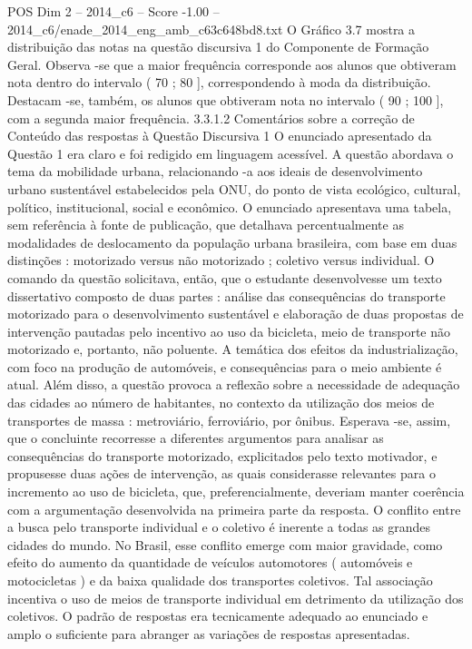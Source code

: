 \begin{textsample}{POS Dim 2 – 2014\_c6 – Score -1.00 – 2014\_c6/enade\_2014\_eng\_amb\_c63c648bd8.txt}
O Gráfico 3.7 mostra a distribuição das notas na questão discursiva 1 do Componente de Formação Geral.
Observa -se que a maior frequência corresponde aos alunos que obtiveram nota dentro do intervalo ( 70 ; 80 ], correspondendo à moda da distribuição.
Destacam -se, também, os alunos que obtiveram nota no intervalo ( 90 ; 100 ], com a segunda maior frequência. 3.3.1.2 Comentários sobre a correção de Conteúdo das respostas à Questão Discursiva 1 O enunciado apresentado da Questão 1 era claro e foi redigido em linguagem acessível.
A questão abordava o tema da mobilidade urbana, relacionando -a aos ideais de desenvolvimento urbano sustentável estabelecidos pela ONU, do ponto de vista ecológico, cultural, político, institucional, social e econômico.
O enunciado apresentava uma tabela, sem referência à fonte de publicação, que detalhava percentualmente as modalidades de deslocamento da população urbana brasileira, com base em duas distinções : motorizado versus não motorizado ; coletivo versus individual.
O comando da questão solicitava, então, que o estudante desenvolvesse um texto dissertativo composto de duas partes : análise das consequências do transporte motorizado para o desenvolvimento sustentável e elaboração de duas propostas de intervenção pautadas pelo incentivo ao uso da bicicleta, meio de transporte não motorizado e, portanto, não poluente.
A temática dos efeitos da industrialização, com foco na produção de automóveis, e consequências para o meio ambiente é atual.
Além disso, a questão provoca a reflexão sobre a necessidade de adequação das cidades ao número de habitantes, no contexto da utilização dos meios de transportes de massa : metroviário, ferroviário, por ônibus.
Esperava -se, assim, que o concluinte recorresse a diferentes argumentos para analisar as consequências do transporte motorizado, explicitados pelo texto motivador, e propusesse duas ações de intervenção, as quais considerasse relevantes para o incremento ao uso de bicicleta, que, preferencialmente, deveriam manter coerência com a argumentação desenvolvida na primeira parte da resposta.
O conflito entre a busca pelo transporte individual e o coletivo é inerente a todas as grandes cidades do mundo.
No Brasil, esse conflito emerge com maior gravidade, como efeito do aumento da quantidade de veículos automotores ( automóveis e motocicletas ) e da baixa qualidade dos transportes coletivos.
Tal associação incentiva o uso de meios de transporte individual em detrimento da utilização dos coletivos.
O padrão de respostas era tecnicamente adequado ao enunciado e amplo o suficiente para abranger as variações de respostas apresentadas.

\end{textsample}
